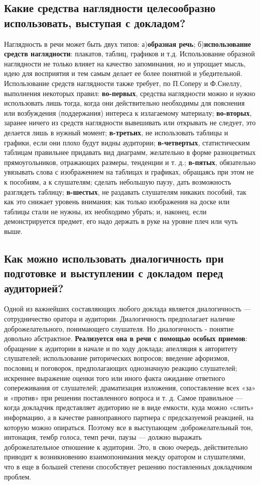 \subsection{Какие средства наглядности целесообразно использовать, выступая с докладом?}
Наглядность в речи может быть двух типов: а)\textbf{образная речь}; б)\textbf{использование средств наглядности}: плакатов, таблиц, графиков и т.д. Использование образной наглядности не только влияет на качество запоминания, но и упрощает мысль, идею для восприятия и тем самым делает ее более понятной и убедительной. Использование средств наглядности также требует, по П.Соперу и Ф.Снеллу, выполнения некоторых правил: \textbf{во-первых}, средства наглядности можно и нужно использовать лишь тогда, когда они действительно необходимы для пояснения или возбуждения (поддержания) интереса к излагаемому материалу; \textbf{во-вторых}, заранее ничего из средств наглядности вывешивать или открывать не следует, это делается лишь в нужный момент; \textbf{в-третьих}, не использовать таблицы и графики, если они плохо будут видны аудитории; \textbf{в-четвертых}, статистическим таблицам правильнее придавать вид диаграмм, желательно в форме разноцветных прямоугольников, отражающих размеры, тенденции и т. д.; \textbf{в-пятых}, обязательно увязывать слова с изображением на таблицах и графиках, обращаясь при этом не к пособиям, а к слушателям; сделать небольшую паузу, дать возможность разглядеть таблицу; \textbf{в-шестых}, не раздавать слушателям никаких пособий, так как это снижает уровень внимания; как только изображения на доске или таблицы стали не нужны, их необходимо убрать; и, наконец, если демонстрируется предмет, его надо держать в руке на уровне плеч или чуть выше. 

\subsection{Как можно использовать диалогичность при подготовке и выступлении с докладом перед аудиторией?}
Одной из важнейших составляющих любого доклада является диалогичность — сотрудничество оратора и аудитории. Диалогичность предполагает наличие доброжелательного, понимающего слушателя. Но диалогичность - понятие довольно абстрактное. \textbf{Реализуется она в речи с помощью особых приемов}: обращение к аудитории в начале и по ходу доклада; апелляция к авторитету слушателей; использование риторических вопросов; введение афоризмов, пословиц и поговорок, предполагающих однозначную реакцию слушателей; искреннее выражение оценки того или иного факта ожидание ответного сопереживания от слушателей; драматизация изложения, сопоставление всех «за» и «против» при решении поставленного вопроса и т. д. Самое правильное — когда докладчик представляет аудиторию не в виде емкости, куда можно «слить» информацию, а в качестве равноправного партнера с предсказуемой реакцией, на которую можно опираться. Поэтому все в выступающем :доброжелательный тон, интонация, тембр голоса, темп речи, паузы — должно выражать доброжелательное отношение к аудитории. Это, в свою очередь, действительно приводит к возникновению взаимопонимания между оратором и слушателями, что в еще в большей степени способствует решению поставленных докладчиком проблем.